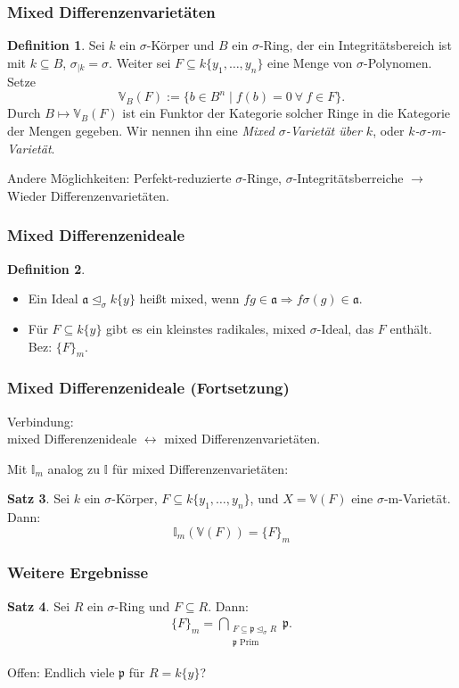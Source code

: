 \documentclass{beamer}
\def\I{\mathbb{I}}
\def\VV{\mathbb{V}}
\def\a{\mathfrak{a}}
\def\p{\mathfrak{p}}
\def\s{\sigma}
\def\si{\unlhd_{\sigma}}
\theoremstyle{definition}
\newtheorem{satz}{Satz}[section]
\newtheorem{defn}[satz]{Definition}
\begin{document}
\begin{frame}\frametitle{Mixed Differenzenvarietäten}

\begin{defn}\label{defnVV}
Sei $k$ ein $\s$-Körper und $B$ ein $\s$-Ring, der ein Integritätsbereich ist mit $k \subseteq B$, $\s_{|k} = \s$. Weiter sei $F \subseteq k\{y_1, \ldots, y_n\}$ eine Menge von $\s$-Polynomen.
Setze $$\VV_B(F):= \{ b \in B^n \mid f(b) = 0~\forall~f \in F \}.$$
Durch $B \mapsto \VV_B(F)$ ist ein Funktor der Kategorie solcher Ringe in die Kategorie der Mengen gegeben. Wir nennen ihn eine \emph{Mixed $\s$-Varietät über $k$}, oder \emph{$k$-$\s$-m-Varietät}.
\end{defn}
$\phantom{ }$ \\
Andere Möglichkeiten: Perfekt-reduzierte $\s$-Ringe, $\s$-Integritätsberreiche $\rightarrow$ Wieder Differenzenvarietäten.
\end{frame}

\begin{frame}\frametitle{Mixed Differenzenideale}
\begin{defn} 
\begin{itemize}
\item Ein Ideal $\a \si k\{y\}$ heißt mixed, wenn $fg \in \a \Rightarrow f\s(g) \in \a$.
\item Für $F \subseteq k\{y\}$ gibt es ein kleinstes radikales, mixed $\s$-Ideal, das $F$ enthält. Bez: $\{F\}_m.$
\end{itemize}
\end{defn}
\end{frame}

\begin{frame}\frametitle{Mixed Differenzenideale (Fortsetzung)}
\begin{center} Verbindung: \\  mixed Differenzenideale $\leftrightarrow$ mixed Differenzenvarietäten. \end{center}
Mit $\I_m$ analog zu $\I$ für mixed Differenzenvarietäten: 
\begin{satz}
Sei $k$ ein $\s$-Körper, $F \subseteq k\{y_1,\ldots,y_n\}$, und $X = \VV(F)$ eine $\s$-m-Varietät. Dann:
\[ \I_m(\VV(F)) = \{ F \}_m \]
\end{satz}
\end{frame}

\begin{frame}\frametitle{Weitere Ergebnisse}
\begin{satz}\label{intersectionprimes}
Sei $R$ ein $\s$-Ring und $F \subseteq R$. Dann:
\begin{align*} \{F\}_m = \bigcap_{\substack{F \subseteq \p \si R \\ \p \text{ Prim}}} \p. \end{align*}
\end{satz}
Offen: Endlich viele $\p$ für $R = k\{y\}$?
\end{frame}
\end{document}
